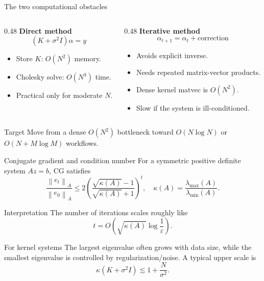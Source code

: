 \documentclass[aspectratio=169,10pt]{beamer}
\newcommand{\norm}[1]{\left\lVert #1 \right\rVert}
\newcommand{\sig}{\sigma^2}
\begin{document}
\begin{frame}{The two computational obstacles}
\begin{columns}[T,totalwidth=\textwidth]
\begin{column}{0.48\textwidth}
\textbf{Direct method}
\[
(K+\sig I)\alpha=y
\]
\begin{itemize}
  \item Store $K$: $O(N^2)$ memory.
  \item Cholesky solve: $O(N^3)$ time.
  \item Practical only for moderate $N$.
\end{itemize}
\end{column}
\begin{column}{0.48\textwidth}
\textbf{Iterative method}
\[
\alpha_{t+1}=\alpha_t+\text{correction}
\]
\begin{itemize}
  \item Avoids explicit inverse.
  \item Needs repeated matrix-vector products.
  \item Dense kernel matvec is $O(N^2)$.
  \item Slow if the system is ill-conditioned.
\end{itemize}
\end{column}
\end{columns}

\vspace{0.6em}
\begin{alertblock}{Target}
Move from a dense $O(N^2)$ bottleneck toward $O(N\log N)$ or $O(N+M\log M)$ workflows.
\end{alertblock}
\end{frame}

\begin{frame}{Conjugate gradient and condition number}
For a symmetric positive definite system $A z=b$, CG satisfies
\[
\frac{\norm{e_t}_A}{\norm{e_0}_A}
\leq
2\left(\frac{\sqrt{\kappa(A)}-1}{\sqrt{\kappa(A)}+1}\right)^t,
\quad
\kappa(A)=\frac{\lambda_{\max}(A)}{\lambda_{\min}(A)}.
\]

\begin{block}{Interpretation}
The number of iterations scales roughly like
\[
 t = O\!\left(\sqrt{\kappa(A)}\log\frac{1}{\varepsilon}\right).
\]
\end{block}

\begin{alertblock}{For kernel systems}
The largest eigenvalue often grows with data size, while the smallest eigenvalue is controlled by regularization/noise. A typical upper scale is
\[
\kappa(K+\sig I) \lesssim 1+\frac{N}{\sig}.
\]
\end{alertblock}
\end{frame}
\end{document}

